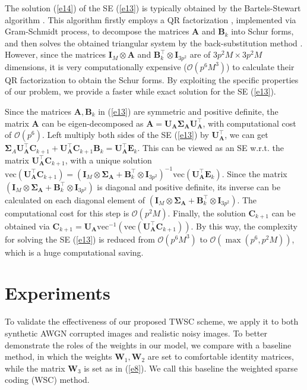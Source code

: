 The solution (\ref{e14}) of the SE (\ref{e13}) is typically obtained by the Bartels-Stewart algorithm \cite{Bartels1972}. This algorithm firstly employs a QR factorization \cite{GolubMatrix}, implemented via Gram-Schmidt process, to decompose the matrices $\bm{A}$ and $\bm{B}_{k}$ into Schur forms, and then solves the obtained triangular system by the back-substitution method \cite{bareiss1968sylvester}. However, since the matrices $\bm{I}_{M}\otimes\bm{A}$ and $\bm{B}_{k}^{\top}\otimes\bm{I}_{3p^2}$ are of $3p^2M\times 3p^2M$ dimensions, it is very computationally expensive ($\mathcal{O}(p^6M^3)$) to calculate their QR factorization to obtain the Schur forms. By exploiting the specific properties of our problem, we provide a faster while exact solution for the SE (\ref{e13}).

Since the matrices $\bm{A},\bm{B}_{k}$ in (\ref{e13}) are symmetric and positive definite, the matrix $\bm{A}$ can be eigen-decomposed as $\bm{A}=\bm{U}_{\bm{A}}\bm{\Sigma}_{\bm{A}}\bm{U}_{\bm{A}}^{\top}$, with computational cost of $\mathcal{O}(p^6)$. Left multiply both sides of the SE (\ref{e13}) by $\bm{U}_{\bm{A}}^{\top}$, we can get
$
\bm{\Sigma}_{A}\bm{U}_{\bm{A}}^{\top}\bm{C}_{k+1}
+
\bm{U}_{\bm{A}}^{\top}\bm{C}_{k+1}\bm{B}_{k}
=
\bm{U}_{\bm{A}}^{\top}\bm{E}_{k}
$.
This can be viewed as an SE w.r.t. the matrix $\bm{U}_{\bm{A}}^{\top}\bm{C}_{k+1}$, with a unique solution
$
\text{vec}(\bm{U}_{\bm{A}}^{\top}\bm{C}_{k+1})=(\bm{I}_{M}\otimes\bm{\Sigma}_{\bm{A}}
+
\bm{B}_{k}^{\top}\otimes\bm{I}_{3p^2})^{-1}
\text{vec}(\bm{U}_{\bm{A}}^{\top}\bm{E}_{k})
$.
Since the matrix $(\bm{I}_{M}\otimes\bm{\Sigma}_{\bm{A}}
+
\bm{B}_{k}^{\top}\otimes\bm{I}_{3p^2})$ is diagonal and positive definite, its inverse can be calculated on each diagonal element of 
$(\bm{I}_{M}\otimes\bm{\Sigma}_{\bm{A}}
+
\bm{B}_{k}^{\top}\otimes\bm{I}_{3p^2})$. The computational cost for this step is $\mathcal{O}(p^2M)$. Finally, the solution $\bm{C}_{k+1}$ can be obtained via
$
\bm{C}_{k+1}=\bm{U}_{\bm{A}}\text{vec}^{-1}(\text{vec}(\bm{U}_{\bm{A}}^{\top}\bm{C}_{k+1}))
$.
By this way, the complexity for solving the SE (\ref{e13}) is reduced from $\mathcal{O}(p^6M^3)$ to $\mathcal{O}(\max(p^6,p^2M))$, which is a huge computational saving.


\section{Experiments}

To validate the effectiveness of our proposed TWSC scheme, we apply it to both synthetic AWGN corrupted images and realistic noisy images. To better demonstrate the roles of the weights in our model, we compare with a baseline method, in which the weights $\bm{W}_{1},\bm{W}_{2}$ are set to comfortable identity matrices, while the matrix $\bm{W}_{3}$ is set as in (\ref{e8}). We call this baseline the weighted sparse coding (WSC) method.

